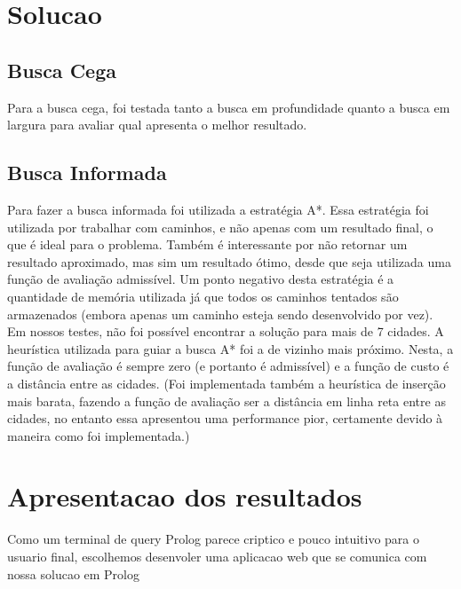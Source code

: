 \documentclass[12pt,a4paper]{article}
\begin{document}
\section{Solucao}

\subsection{Busca Cega}
Para a busca cega, foi testada tanto a busca em profundidade quanto a busca em largura para avaliar qual apresenta o melhor resultado.	


\subsection{Busca Informada}
Para fazer a busca informada foi utilizada a estratégia A*. Essa estratégia foi utilizada por trabalhar com caminhos, e não apenas com um resultado final, o que é ideal para o problema. Também é interessante por não retornar um resultado aproximado, mas sim um resultado ótimo, desde que seja utilizada uma função de avaliação admissível. 
	Um ponto negativo desta estratégia é a quantidade de memória utilizada já que todos os caminhos tentados são armazenados (embora apenas um caminho esteja sendo desenvolvido por vez). Em nossos testes, não foi possível encontrar a solução para mais de 7 cidades.
  A heurística utilizada para guiar a busca A* foi a de vizinho mais próximo. Nesta, a função de avaliação é sempre zero (e portanto é admissível) e a função de custo é a distância entre as cidades. (Foi implementada também a heurística de inserção mais barata, fazendo a função de avaliação ser a distância em linha reta entre as cidades, no entanto essa apresentou uma performance pior, certamente devido à maneira como foi implementada.)
  \section{Apresentacao dos resultados}
  Como um terminal de query Prolog parece criptico e pouco intuitivo para o usuario final, escolhemos desenvoler uma aplicacao web que se comunica com nossa solucao em Prolog 
\end{document}
